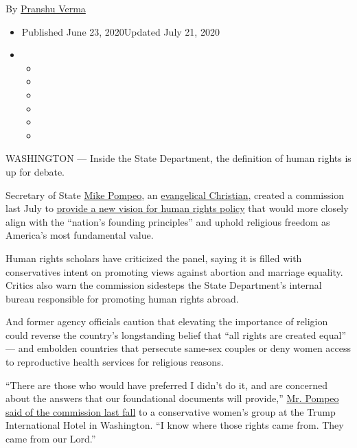 By \href{https://www.nytimes3xbfgragh.onion/by/pranshu-verma}{Pranshu
Verma}

\begin{itemize}
\item
  Published June 23, 2020Updated July 21, 2020
\item
  \begin{itemize}
  \item
  \item
  \item
  \item
  \item
  \item
  \end{itemize}
\end{itemize}

WASHINGTON --- Inside the State Department, the definition of human
rights is up for debate.

Secretary of State
\href{https://www.nytimes3xbfgragh.onion/2020/07/21/world/europe/mike-pompeo-boris-johnson-china.html}{Mike
Pompeo}, an
\href{https://www.nytimes3xbfgragh.onion/2019/03/30/us/politics/pompeo-christian-policy.html}{evangelical
Christian}, created a commission last July to
\href{https://www.nytimes3xbfgragh.onion/2019/07/08/us/politics/state-human-rights.html}{provide
a new vision for human rights policy} that would more closely align with
the ``nation's founding principles'' and uphold religious freedom as
America's most fundamental value.

Human rights scholars have criticized the panel, saying it is filled
with conservatives intent on promoting views against abortion and
marriage equality. Critics also warn the commission sidesteps the State
Department's internal bureau responsible for promoting human rights
abroad.

And former agency officials caution that elevating the importance of
religion could reverse the country's longstanding belief that ``all
rights are created equal'' --- and embolden countries that persecute
same-sex couples or deny women access to reproductive health services
for religious reasons.

``There are those who would have preferred I didn't do it, and are
concerned about the answers that our foundational documents will
provide,''
\href{https://www.state.gov/secretary-michael-r-pompeo-at-the-concerned-women-for-america-40th-anniversary-luncheon/}{Mr.
Pompeo said of the commission last fall} to a conservative women's group
at the Trump International Hotel in Washington. ``I know where those
rights came from. They came from our Lord.''

